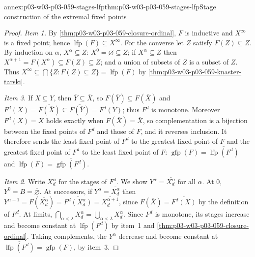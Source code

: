 \begin{annexitem}{annex:p03-w03-p03-059-stages-lfp}{thm:p03-w03-p03-059-stages-lfp}{Stage construction of the extremal fixed points}
\begin{proof}
\emph{Item 1.} By \cref{thm:p03-w03-p03-059-closure-ordinal}, \(F\) is
inductive and \(X^\infty\) is a fixed point; hence
\(\operatorname{lfp}(F)\subseteq X^\infty\). For the converse let \(Z\)
satisfy \(F(Z)\subseteq Z\). By induction on \(\alpha\),
\(X^\alpha\subseteq Z\): \(X^0=\varnothing\subseteq Z\); if
\(X^\alpha\subseteq Z\) then \(X^{\alpha+1}=F(X^\alpha)\subseteq
F(Z)\subseteq Z\); and a union of subsets of \(Z\) is a subset of \(Z\).
Thus \(X^\infty\subseteq\bigcap\{Z:F(Z)\subseteq Z\}=\operatorname{lfp}(F)\)
by \cref{thm:p03-w03-p03-059-knaster-tarski}.

\emph{Item 3.} If \(X\subseteq Y\), then \(\overline Y\subseteq\overline
X\), so \(F(\overline Y)\subseteq F(\overline X)\) and
\(F^d(X)=\overline{F(\overline X)}\subseteq\overline{F(\overline Y)}=
F^d(Y)\); thus \(F^d\) is monotone. Moreover \(F^d(X)=X\) holds exactly
when \(F(\overline X)=\overline X\), so complementation is a bijection
between the fixed points of \(F^d\) and those of \(F\), and it reverses
inclusion. It therefore sends the least fixed point of \(F^d\) to the
greatest fixed point of \(F\) and the greatest fixed point of \(F^d\) to
the least fixed point of \(F\):
\(\operatorname{gfp}(F)=\overline{\operatorname{lfp}(F^d)}\) and
\(\operatorname{lfp}(F)=\overline{\operatorname{gfp}(F^d)}\).

\emph{Item 2.} Write \(X_d^\alpha\) for the stages of \(F^d\). We show
\(Y^\alpha=\overline{X_d^\alpha}\) for all \(\alpha\). At \(0\),
\(Y^0=B=\overline\varnothing\). At successors, if
\(Y^\alpha=\overline{X_d^\alpha}\) then \(Y^{\alpha+1}=F(\overline{X_d^\alpha})=
\overline{F^d(X_d^\alpha)}=\overline{X_d^{\alpha+1}}\), since
\(F(\overline X)=\overline{F^d(X)}\) by the definition of \(F^d\). At limits,
\(\bigcap_{\alpha<\lambda}\overline{X_d^\alpha}=
\overline{\bigcup_{\alpha<\lambda}X_d^\alpha}\). Since \(F^d\) is
monotone, its stages increase and become constant at
\(\operatorname{lfp}(F^d)\) by item~1 and
\cref{thm:p03-w03-p03-059-closure-ordinal}. Taking complements, the
\(Y^\alpha\) decrease and become constant at
\(\overline{\operatorname{lfp}(F^d)}=\operatorname{gfp}(F)\), by item~3.
\end{proof}
\end{annexitem}

